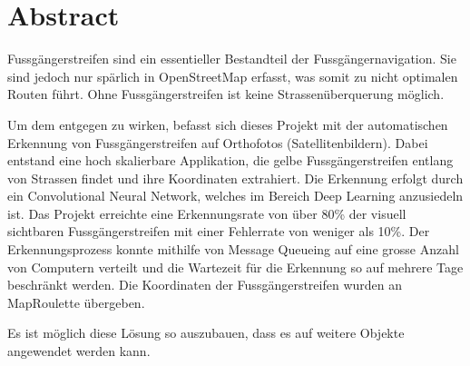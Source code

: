 \section{Abstract}

Fussgängerstreifen sind ein essentieller Bestandteil der Fussgängernavigation. Sie sind jedoch nur spärlich in OpenStreetMap erfasst, was somit zu nicht optimalen Routen führt. Ohne Fussgängerstreifen ist keine Strassenüberquerung möglich.

Um dem entgegen zu wirken,  befasst sich dieses Projekt mit der automatischen Erkennung von Fussgängerstreifen auf Orthofotos (Satellitenbildern). 
Dabei entstand eine hoch skalierbare Applikation, die gelbe Fussgängerstreifen entlang von Strassen findet und ihre Koordinaten extrahiert. Die Erkennung erfolgt durch ein Convolutional Neural Network, welches im Bereich Deep Learning anzusiedeln ist.
Das Projekt erreichte eine Erkennungsrate von über 80\% der visuell sichtbaren Fussgängerstreifen mit einer Fehlerrate von weniger als 10\%. Der Erkennungsprozess konnte mithilfe von Message Queueing auf eine grosse Anzahl von Computern verteilt und die Wartezeit für die Erkennung so auf mehrere Tage beschränkt werden. Die Koordinaten der Fussgängerstreifen wurden an MapRoulette übergeben.

Es ist möglich diese Lösung so auszubauen, dass es auf weitere Objekte angewendet werden kann.
